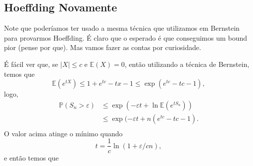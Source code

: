 \documentclass[12pt,a4paper,oneside]{book}
\theoremstyle{definition}
\theoremstyle{remark}
\numberwithin{equation}{section}
\newcommand{\e}{\varepsilon}
\newcommand{\E}{\mathbb{E}}
\newcommand{\pr}{\mathbb{P}}
\begin{document}

\subsection{Hoeffding Novamente}

Note que poderíamos ter usado a mesma técnica que utilizamos em Bernstein para provarmos Hoeffding. É claro que o esperado é que conseguimos um bound pior (pense por que). Mas vamos fazer as contas por curiosidade.

É fácil ver que, se $|X|\leq c$ e $\E(X)=0$, então utilizando a técnica de Bernstein, temos que
$$\E(e^{tX}) \leq 1 + e^{tc}-tx-1\leq \exp(e^{tc}-tc-1), $$
logo,
\begin{align*}
\pr(S_n>\e)&\leq \exp(-\e t + \ln\E(e^{tS_n}))\\
	&\leq \exp(-\e t + n(e^{tc}-tc-1).\\
\end{align*}
O valor acima atinge o mínimo quando 
$$ t = \dfrac{1}{c}\ln(1+\e/cn),$$ e então temos que
\end{document}
